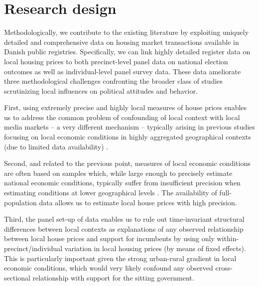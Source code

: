 \documentclass[12pt,a4paper]{article}
\begin{document}
	
	\section{Research design}\label{resdesign}
	
	Methodologically, we contribute to the existing literature by exploiting uniquely detailed and comprehensive data on housing market transactions available in Danish public registries. Specifically, we can link highly detailed register data on local housing prices to both precinct-level panel data on national election outcomes as well as individual-level panel survey data. These data ameliorate three methodological challenges confronting the broader class of studies scrutinizing local influences on political attitudes and behavior.
	
	First, using extremely precise and highly local measures of house prices enables us to address the common problem of confounding of local context with local media markets -- a very different mechanism -- typically arising in previous studies focusing on local economic conditions in highly aggregated geographical contexts (due to limited data availability) \citep[][]{bisgaard2016reconsidering}.  
	
	Second, and related to the previous point, measures of local economic conditions are often based on samples which, while large enough to precisely estimate national economic conditions, typically suffer from insufficient precision when estimating conditions at lower geographical levels \citep[][]{healy2014presidential}. The availability of full-population data allows us to estimate local house prices with high precision.
	
	Third, the panel set-up of data enables us to rule out time-invariant structural differences between local contexts as explanations of any observed relationship between local house prices and support for incumbents by using only within-precinct/individual variation in local housing prices (by means of fixed effects). This is particularly important given the strong urban-rural gradient in local economic conditions, which would very likely confound any observed cross-sectional relationship with support for the sitting government.
	
\end{document}
